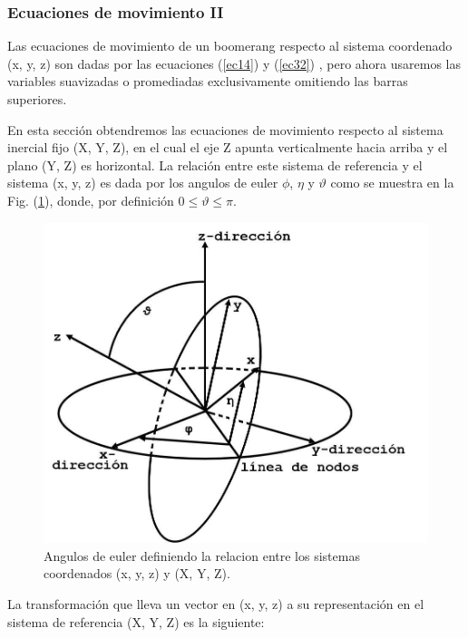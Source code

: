 	\subsubsection{Ecuaciones de movimiento II}

	Las ecuaciones de movimiento de un boomerang respecto al sistema coordenado (x, y, z) son dadas por las ecuaciones (\ref{ec14}) y (\ref{ec32}) , pero ahora usaremos las variables suavizadas o promediadas exclusivamente omitiendo las barras superiores.

	En esta sección obtendremos las ecuaciones de movimiento respecto al sistema inercial fijo (X, Y, Z), en el cual el eje Z apunta verticalmente hacia arriba y el plano  (Y, Z) es horizontal. La relación entre este sistema de referencia y el sistema (x, y, z) es dada por los angulos de euler $\phi$, $\eta$ y $\vartheta$ como se muestra en la Fig. (\ref{fig13}), donde, por definición $0\le \vartheta \le \pi$.

		\begin{figure}[ht]
		\begin{center}
		\includegraphics[scale=0.3]{imagenes/3-boomerang/euler_angles.png}
		\caption{Angulos de euler definiendo la relacion entre los sistemas coordenados (x, y, z) y (X, Y, Z).}
		\label{fig13}
		\end{center}
		\end{figure}

	La transformación que lleva un vector en (x, y, z) a su representación en el sistema de referencia (X, Y, Z) es la siguiente:

